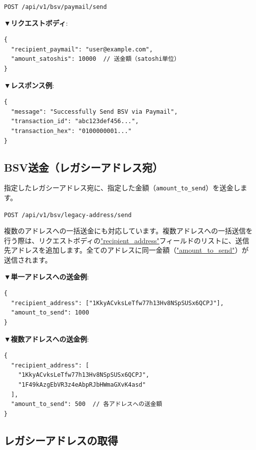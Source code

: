 \documentclass[11pt,a4paper]{ltjsarticle}  %
\begin{document}
\begin{tcolorbox}[colback=blue!5,colframe=blue!50!black,title=エンドポイント]
\texttt{POST /api/v1/bsv/paymail/send}
\end{tcolorbox}

\textbf{▼リクエストボディ}:
\begin{lstlisting}[style=json]
{
  "recipient_paymail": "user@example.com",
  "amount_satoshis": 10000  // 送金額（satoshi単位）
}
\end{lstlisting}

\textbf{▼レスポンス例}:
\begin{lstlisting}[style=json]
{
  "message": "Successfully Send BSV via Paymail",
  "transaction_id": "abc123def456...",
  "transaction_hex": "0100000001..."
}
\end{lstlisting}

\subsection{BSV送金（レガシーアドレス宛）}

指定したレガシーアドレス宛に、指定した金額（\verb|amount_to_send|）を送金します。

\begin{tcolorbox}[colback=blue!5,colframe=blue!50!black,title=エンドポイント]
\texttt{POST /api/v1/bsv/legacy-address/send}
\end{tcolorbox}

複数のアドレスへの一括送金にも対応しています。複数アドレスへの一括送信を行う際は、リクエストボディの\url{"recipient_address"}フィールドのリストに、送信先アドレスを追加します。全てのアドレスに同一金額（\url{"amount_to_send"}）が送信されます。

\textbf{▼単一アドレスへの送金例}:
\begin{lstlisting}[style=json]
{
  "recipient_address": ["1KkyACvksLeTfw77h13Hv8NSpSUSx6QCPJ"],
  "amount_to_send": 1000
}
\end{lstlisting}

\textbf{▼複数アドレスへの送金例}:
\begin{lstlisting}[style=json]
{
  "recipient_address": [
    "1KkyACvksLeTfw77h13Hv8NSpSUSx6QCPJ",
    "1F49kAzgEbVR3z4eAbpRJbHWmaGXvK4asd"
  ],
  "amount_to_send": 500  // 各アドレスへの送金額
}
\end{lstlisting}

\subsection{レガシーアドレスの取得}
\end{document}
